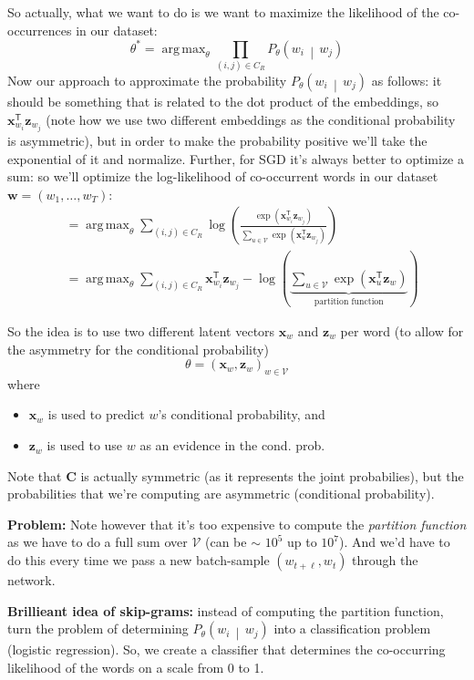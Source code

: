 \documentclass[a2paper,8pt]{extarticle}
\newcommand{\cV}{\mathcal{V}}
\newcommand{\cProb}[3][]{P_{#1}\left( #2 \,\middle|\, #3 \right)}
\newcommand{\cDist}[3]{#1\left( #2 \,\middle|\, #3 \right)}
\newcommand*{\T}{\mathsf{T}}
\DeclareMathOperator*{\argmax}{arg\,max}
\newcommand{\mat}[1]{\mathbf{#1}}
\renewcommand{\vec}[1]{\mathbf{#1}}
\newcommand{\vw}{\vec{w}}
\newcommand{\vx}{\vec{x}}
\newcommand{\vz}{\vec{z}}
\newcommand{\MC}{\mat{C}}
\begin{document}
\begin{landscape}
\begin{multicols*}{7}
So actually, what we want to do is we want to maximize the likelihood of the
co-occurrences in our dataset:
\[
\theta^*
=\argmax_{\theta}
\prod_{(i,j)\in C_R}
\cProb[\theta]{w_i}{w_j}
\]
Now our approach to approximate the probability $\cProb[\theta]{w_i}{w_j}$ as
follows: it should be something that is related to the dot product of the
embeddings, so $\vx_{w_i}^\T\vz_{w_j}$ (note how we use two different
embeddings as the conditional probability is asymmetric), but in order to make
the probability positive we'll take the exponential of it and normalize.
Further, for SGD it's always better to optimize a sum: so we'll optimize the
log-likelihood of co-occurrent words in our dataset $\vw=(w_1,\ldots,w_T)$:
\begin{align*}
&=\argmax_{\theta}
\sum_{(i,j)\in C_R}
\log\left(
\frac{
\exp\left(\vx_{w_i}^\T\vz_{w_j}\right)
}{
\sum_{u\in\cV}
\exp\left(\vx_{u}^\T\vz_{w_j}\right)
}
\right)
\\
&=\argmax_{\theta}
\sum_{(i,j)\in C_R}
\vx_{w_i}^\T\vz_{w_j}
-
\log\left(\underbrace{\sum_{u\in\cV}\exp\left(\vx_u^\T\vz_w\right)}_{
\text{partition function}
}\right)
\end{align*}

So the idea is to use two different latent vectors $\vx_w$ and $\vz_w$ per word
(to allow for the asymmetry for the conditional probability)
\[
\theta=(\vx_w,\vz_w)_{w\in\cV}
\]
where
\begin{itemize}
  \item $\vx_w$ is used to predict $w$'s conditional probability, and
  \item $\vz_w$ is used to use $w$ as an evidence in the cond. prob.
\end{itemize}

Note that $\MC$ is actually symmetric (as it represents the joint probabilies),
but the probabilities that we're computing are asymmetric (conditional
probability).

\textbf{Problem:} Note however that it's too expensive to compute the
\emph{partition function} as we have to do a full sum over $\cV$ (can be $\sim$
$10^5$ up to $10^7$). And we'd have to do this every time we pass a new
batch-sample $(w_{t+\ell},w_t)$ through the network.

\textbf{Brillieant idea of skip-grams:} instead of computing the partition
function, turn the problem of determining $\cDist{P_\theta}{w_i}{w_j}$ into a
classification problem (logistic regression). So, we create a classifier that
determines the co-occurring likelihood of the words on a scale from 0 to 1.


\end{multicols*}
\end{landscape}
\end{document}
